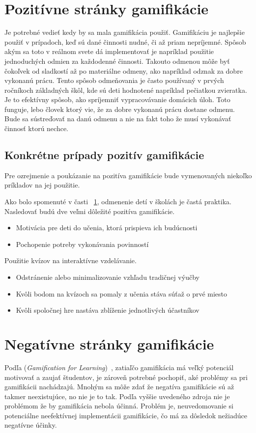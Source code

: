 \documentclass[10pt,oneside,slovak,a4paper]{article}
\begin{document}
\section{Pozitívne stránky gamifikácie} \label{PozitivnaGamifikacia}

Je potrebné vedieť kedy by sa mala gamifikácia použiť. Gamifikáciu je najlepšie použiť v prípadoch, keď sú dané činnosti nudné, či až priam nepríjemné. Spôsob akým sa toto v reálnom svete dá implementovať je napríklad použitie jednoduchých odmien za každodenné činnosti. Takouto odmenou môže byť čokoľvek od sladkostí až po materiálne odmeny, ako napríklad odznak za dobre vykonanú prácu. Tento spôsob odmeňovania je často používaný v prvých ročníkoch základných škôl, kde sú deti hodnotené napríklad pečiatkou zvieratka. Je to efektívny spôsob, ako spríjemniť vypracovávanie domácich úloh. Toto funguje, lebo človek ktorý vie, že za dobre vykonanú prácu dostane odmenu. Bude sa sústreďovať na danú odmenu a nie na fakt toho že musí vykonávať činnosť ktorú nechce.

\subsection{Konkrétne prípady pozitív gamifikácie} \label{PozitivnaPriklady}
Pre ozrejmenie a poukázanie na pozitíva gamifikácie bude vymenovaných niekoľko príkladov na jej použitie.

Ako bolo spomenuté v časti ~\ref{PozitivnaGamifikacia}, odmenenie detí v školách je častá praktika. Nasledovať budú dve veľmi dôležité pozitíva gamifikácie.
\begin{itemize}
\item Motivácia pre deti do učenia, ktorá prispieva ich budúcnosti
\item Pochopenie potreby vykonávania povinností
\end{itemize}
Použitie kvízov na interaktívne vzdelávanie.
\begin{itemize}
\item Odstránenie alebo minimalizovanie vzhľadu tradičnej výučby
\item Kvôli bodom na kvízoch sa pomaly z učenia stáva súťaž o prvé miesto
\item Kvôli spoločnej hre nastáva zblíženie jednotlivých účastníkov
\end{itemize}



\section{Negatívne stránky gamifikácie} \label{NegativnaGamifikacia}
 Podľa (\emph{Gamification for Learning})~\cite{10.1007/978-3-319-97934-2_9}, zatiaľčo gamifikácia má veľký potenciál motivovať a zaujať študentov, je zároveň potrebné pochopiť, aké problémy sa pri gamifikácii nachádzajú. Mnohým sa môže zdať že negatíva gamifikácie sú až takmer neexistujúce, no nie je to tak. Podľa vyššie uvedeného zdroja nie je problémom že by gamifikácia nebola účinná. Problém je, neuvedomovanie si potenciálne neefektívnej implementácii gamifikácie, čo má za dôsledok nežiadúce negatívne účinky. 
\end{document}
